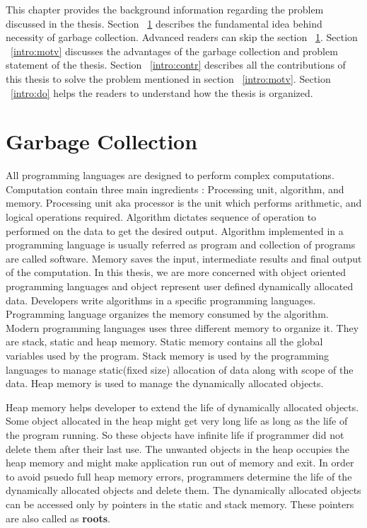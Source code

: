 
This chapter provides the background information regarding the problem discussed in the thesis. Section
~\ref{intro:gc} describes the fundamental idea behind necessity of garbage collection. Advanced readers can skip the section ~\ref{intro:gc}. Section ~\ref{intro:motv} discusses the advantages of the garbage collection and problem statement of the thesis. Section ~\ref{intro:contr} describes all the contributions of this thesis to solve the problem mentioned in section ~\ref{intro:motv}. Section ~\ref{intro:do} helps the readers to understand how the thesis is organized.
\section{Garbage Collection}
\label{intro:gc}
All programming languages are designed to perform complex computations. Computation contain three main ingredients : Processing unit, algorithm, and memory. Processing unit aka processor is the unit which performs arithmetic, and logical operations required. Algorithm dictates sequence of operation to performed on the data to get the desired output. Algorithm implemented in a programming language is usually referred as program and collection of programs are called software. Memory saves the input, intermediate results and final output of the computation. In this thesis, we are more concerned with object oriented programming languages and object represent user defined dynamically allocated data. Developers write algorithms in a specific programming languages. Programming language organizes the memory consumed by the algorithm. Modern programming languages uses three different memory to organize it. They are stack, static and heap memory. Static memory contains all the global variables used by the program. Stack memory is used by the programming languages to manage static(fixed size) allocation of data along with scope of the data. Heap memory is used to manage the dynamically allocated objects. 

Heap memory helps developer to extend the life of dynamically allocated objects. Some object allocated in the heap might get very long life as long as the life of the program running. So these objects have infinite life if programmer did not delete them after their last use. The unwanted objects in the heap occupies the heap memory and might make application run out of memory and exit. In order to avoid psuedo full heap memory errors, programmers determine the life of the dynamically allocated objects and delete them. The dynamically allocated objects can be accessed only by pointers in the static and stack memory. These pointers are also called as \textbf{roots}.

